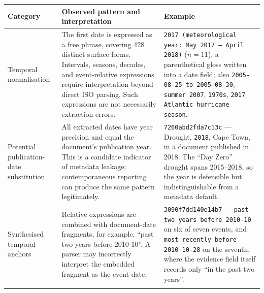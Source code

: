\begin{table}[t]
\centering
\small
\setlength{\tabcolsep}{5pt}
\begin{tabularx}{\textwidth}{
@{}>{\raggedright\arraybackslash}p{}
>{\raggedright\arraybackslash}X
>{\raggedright\arraybackslash}p{}@{}}
\toprule
\textbf{Category} &
\textbf{Observed pattern and interpretation} &
\textbf{Example} \\
\midrule

Temporal normalisation &
The first date is expressed as a free phrase, covering 428 distinct surface
forms. Intervals, seasons, decades, and event-relative expressions require
interpretation beyond direct ISO parsing. Such expressions are not necessarily
extraction errors. &
\texttt{2017 (meteorological year: May 2017 -- April 2018)} ($n{=}11$), a
parenthetical gloss written into a date field; also
\texttt{2005-08-25 to 2005-08-30}, \texttt{summer 2007}, \texttt{1970s},
\texttt{2017 Atlantic hurricane season}. \\
\addlinespace

Potential publication-date substitution &
All extracted dates have year precision and equal the document's publication
year. This is a candidate indicator of metadata leakage; contemporaneous
reporting can produce the same pattern legitimately. &
\texttt{7260abd2fda7c13c} --- Drought, \texttt{2018}, Cape Town, in a document
published in 2018. The ``Day Zero'' drought spans 2015--2018, so the year is
defensible but indistinguishable from a metadata default. \\
\addlinespace

Synthesised temporal anchors &
Relative expressions are combined with document-date fragments, for example,
``past two years before 2010-10''. A parser may incorrectly interpret the
embedded fragment as the event date. &
\texttt{3090f7dd140e14b7} --- \texttt{past two years before 2010-10} on six of
seven events, and \texttt{most recently before 2010-10-28} on the seventh,
where the evidence field itself records only ``in the past two years''. \\
\addlinespace


\end{tabularx}
\end{table}
